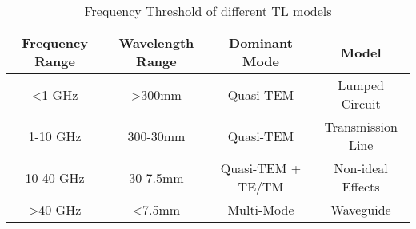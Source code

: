 \begin{table}
\caption{Frequency Threshold of different TL models}
\begin{tabular}{c|c|c|c}
\toprule
Frequency Range & Wavelength Range & Dominant Mode & Model \\
\midrule
\hline
<1 GHz & >300mm & Quasi-TEM & Lumped Circuit \\
1-10 GHz & 300-30mm & Quasi-TEM & Transmission Line \\
10-40 GHz & 30-7.5mm & Quasi-TEM + TE/TM & Non-ideal Effects \\
>40 GHz & <7.5mm & Multi-Mode & Waveguide \\
\bottomrule
\end{tabular}
\end{table}